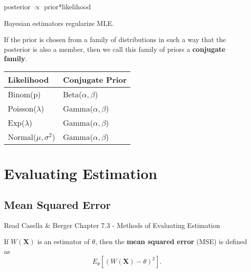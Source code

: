 \documentclass[11pt,fleqn]{book} %
\begin{document}
	\begin{proposition}
	 posterior $\propto$ prior*likelihood
	\end{proposition}

	\begin{remark}
		Bayesian estimators regularize MLE.
	\end{remark}

	\begin{definition}
	If the prior is chosen from a family of distributions in such a way that the posterior is also a member, then we call this family of priors a \textbf{conjugate family}.
	\end{definition}


		\begin{table}[h]
		\centering
		\begin{tabular}{l l}
		\toprule
		\textbf{Likelihood} & \textbf{Conjugate Prior}\\
		\midrule
		Binom(p) & Beta($\alpha, \beta$) \\
		Poisson($\lambda$) & Gamma($\alpha, \beta$) \\
		Exp($\lambda$) & Gamma($\alpha, \beta$) \\
		Normal($\mu, \sigma^2$) & Gamma($\alpha, \beta$) \\
		\bottomrule
		\end{tabular}
		\end{table}


\section{Evaluating Estimation}

\subsection{Mean Squared Error}

	\begin{remark} 
		Read Casella \& Berger Chapter 7.3 - Methods of Evaluating Estimation
	\end{remark} 


	\begin{definition}

	If $W(\bm{X})$ is an estimator of $\theta$, then the \textbf{mean squared error} (MSE) is defined as
	\[
		E_\theta\left[(W(\bm{X}) - \theta)^2\right].
	\]

	\end{definition}
\end{document}
